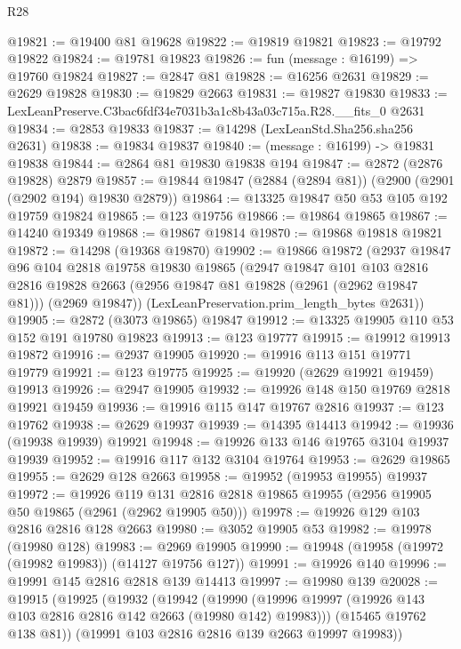 \begin{lexlean}{R28}
\begin{coremodule}
@19821 := @19400 @81 @19628
@19822 := @19819 @19821
@19823 := @19792 @19822
@19824 := @19781 @19823
@19826 := fun (message : @16199) => @19760 @19824
@19827 := @2847 @81
@19828 := @16256 @2631
@19829 := @2629 @19828
@19830 := @19829 @2663
@19831 := @19827 @19830
@19833 := LexLeanPreserve.C3bac6fdf34e7031b3a1c8b43a03c715a.R28.__fits_0 @2631
@19834 := @2853 @19833
@19837 := @14298 (LexLeanStd.Sha256.sha256 @2631)
@19838 := @19834 @19837
@19840 := (message : @16199) -> @19831 @19838
@19844 := @2864 @81 @19830 @19838 @194
@19847 := @2872 (@2876 @19828) @2879
@19857 := @19844 @19847 (@2884 (@2894 @81)) (@2900 (@2901 (@2902 @194) @19830 @2879))
@19864 := @13325 @19847 @50 @53 @105 @192 @19759 @19824
@19865 := @123 @19756
@19866 := @19864 @19865
@19867 := @14240 @19349
@19868 := @19867 @19814
@19870 := @19868 @19818 @19821
@19872 := @14298 (@19368 @19870)
@19902 := @19866
    @19872
    (@2937
      @19847
      @96
      @104
      @2818
      @19758
      @19830
      @19865
      (@2947
        @19847
        @101
        @103
        @2816
        @2816
        @19828
        @2663
        (@2956 @19847 @81 @19828 (@2961 (@2962 @19847 @81)))
        (@2969 @19847))
      (LexLeanPreservation.prim_length_bytes @2631))
@19905 := @2872 (@3073 @19865) @19847
@19912 := @13325 @19905 @110 @53 @152 @191 @19780 @19823
@19913 := @123 @19777
@19915 := @19912 @19913 @19872
@19916 := @2937 @19905
@19920 := @19916 @113 @151 @19771 @19779
@19921 := @123 @19775
@19925 := @19920 (@2629 @19921 @19459) @19913
@19926 := @2947 @19905
@19932 := @19926 @148 @150 @19769 @2818 @19921 @19459
@19936 := @19916 @115 @147 @19767 @2816
@19937 := @123 @19762
@19938 := @2629 @19937
@19939 := @14395 @14413
@19942 := @19936 (@19938 @19939) @19921
@19948 := @19926 @133 @146 @19765 @3104 @19937 @19939
@19952 := @19916 @117 @132 @3104 @19764
@19953 := @2629 @19865
@19955 := @2629 @128 @2663
@19958 := @19952 (@19953 @19955) @19937
@19972 := @19926
    @119
    @131
    @2816
    @2818
    @19865
    @19955
    (@2956 @19905 @50 @19865 (@2961 (@2962 @19905 @50)))
@19978 := @19926 @129 @103 @2816 @2816 @128 @2663
@19980 := @3052 @19905 @53
@19982 := @19978 (@19980 @128)
@19983 := @2969 @19905
@19990 := @19948 (@19958 (@19972 (@19982 @19983)) (@14127 @19756 @127))
@19991 := @19926 @140
@19996 := @19991 @145 @2816 @2818 @139 @14413
@19997 := @19980 @139
@20028 := @19915
    (@19925
      (@19932
        (@19942
          (@19990 (@19996 @19997 (@19926 @143 @103 @2816 @2816 @142 @2663 (@19980 @142) @19983)))
          (@15465 @19762 @138 @81))
        (@19991 @103 @2816 @2816 @139 @2663 @19997 @19983))

\end{coremodule}
\end{lexlean}
